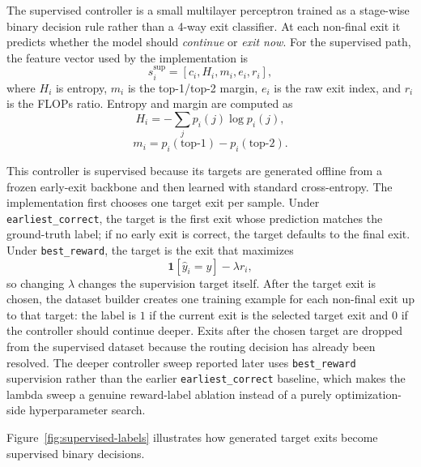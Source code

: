 \documentclass[10pt,twocolumn]{article}
\begin{document}
The supervised controller is a small multilayer perceptron trained as a stage-wise binary decision rule rather than a 4-way exit classifier. At each non-final exit it predicts whether the model should \emph{continue} or \emph{exit now}. For the supervised path, the feature vector used by the implementation is
\begin{equation}
    s_i^{\text{sup}} = [c_i, H_i, m_i, e_i, r_i],
\end{equation}
where $H_i$ is entropy, $m_i$ is the top-1/top-2 margin, $e_i$ is the raw exit index, and $r_i$ is the FLOPs ratio. Entropy and margin are computed as
\begin{equation}
    H_i = -\sum_j p_i(j)\log p_i(j),
\end{equation}
\begin{equation}
    m_i = p_i(\text{top-1}) - p_i(\text{top-2}).
\end{equation}

This controller is supervised because its targets are generated offline from a frozen early-exit backbone and then learned with standard cross-entropy. The implementation first chooses one target exit per sample. Under \texttt{earliest\_correct}, the target is the first exit whose prediction matches the ground-truth label; if no early exit is correct, the target defaults to the final exit. Under \texttt{best\_reward}, the target is the exit that maximizes
\begin{equation}
    \mathbf{1}[\hat{y}_i = y] - \lambda r_i,
\end{equation}
so changing $\lambda$ changes the supervision target itself. After the target exit is chosen, the dataset builder creates one training example for each non-final exit up to that target: the label is $1$ if the current exit is the selected target exit and $0$ if the controller should continue deeper. Exits after the chosen target are dropped from the supervised dataset because the routing decision has already been resolved. The deeper controller sweep reported later uses \texttt{best\_reward} supervision rather than the earlier \texttt{earliest\_correct} baseline, which makes the lambda sweep a genuine reward-label ablation instead of a purely optimization-side hyperparameter search.

Figure~\ref{fig:supervised-labels} illustrates how generated target exits become supervised binary decisions.
\end{document}

